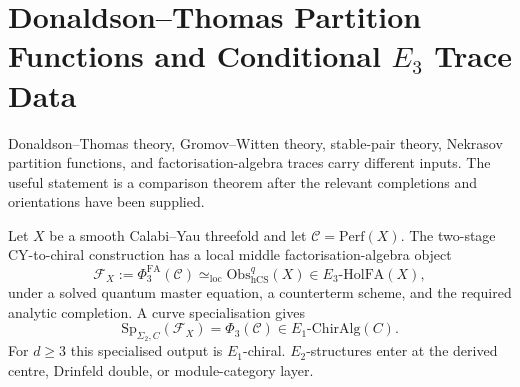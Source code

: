 \section{Donaldson--Thomas Partition Functions and Conditional
\texorpdfstring{$E_3$}{E3} Trace Data}
\label{wn:dt-e3-trace-nekrasov}

\providecommand{\PhiFA}{\Phi^{\mathrm{FA}}}
\providecommand{\Tr}{\mathrm{Tr}}
\providecommand{\Sp}{\mathrm{Sp}}
\providecommand{\QME}{\mathrm{QME}}
\providecommand{\Ethree}{E_3}
\providecommand{\Etwo}{E_2}
\providecommand{\Eone}{E_1}
\providecommand{\cC}{\mathcal{C}}
\providecommand{\cF}{\mathcal{F}}
\providecommand{\cO}{\mathcal{O}}
\providecommand{\cM}{\mathcal{M}}
\providecommand{\Obs}{\mathrm{Obs}}
\providecommand{\hCS}{\mathrm{hCS}}
\providecommand{\Hilb}{\mathrm{Hilb}}
\providecommand{\DT}{\mathrm{DT}}
\providecommand{\GW}{\mathrm{GW}}
\providecommand{\PT}{\mathrm{PT}}
\providecommand{\BPS}{\mathrm{BPS}}
\providecommand{\CoHA}{\mathrm{CoHA}}
\providecommand{\Perf}{\mathrm{Perf}}
\providecommand{\Coh}{\mathrm{Coh}}
\providecommand{\KS}{\mathrm{KS}}
\providecommand{\fgl}{\mathfrak{gl}}
\providecommand{\gghone}{\widehat{\mathfrak{gl}}_1}
\providecommand{\Wilpha}{\mathcal{W}_{1+\infty}}
\providecommand{\kch}{\kappa_{\mathrm{ch}}}
\providecommand{\kcat}{\kappa_{\mathrm{cat}}}
\providecommand{\kBKM}{\kappa_{\mathrm{BKM}}}
\providecommand{\kfiber}{\kappa_{\mathrm{fiber}}}
\providecommand{\chitop}{\chi_{\mathrm{top}}}
\providecommand{\CC}{\mathbb{C}}
\providecommand{\ZZ}{\mathbb{Z}}
\providecommand{\QQ}{\mathbb{Q}}

Donaldson--Thomas theory, Gromov--Witten theory, stable-pair theory,
Nekrasov partition functions, and factorisation-algebra traces carry
different inputs.  The useful statement is a comparison theorem after
the relevant completions and orientations have been supplied.

Let \(X\) be a smooth Calabi--Yau threefold and let
\(\cC=\Perf(X)\).  The two-stage CY-to-chiral construction has a local
middle factorisation-algebra object
\[
  \cF_X := \PhiFA_3(\cC)
  \simeq_{\mathrm{loc}} \Obs^q_{\hCS}(X)
  \in \Ethree\text{-}\mathrm{HolFA}(X),
\]
under a solved quantum master equation, a counterterm scheme, and the
required analytic completion.  A curve specialisation gives
\[
  \Sp_{\Sigma_2,C}(\cF_X)=\Phi_3(\cC)
  \in \Eone\text{-}\mathrm{ChirAlg}(C).
\]
For \(d\geq 3\) this specialised output is \(\Eone\)-chiral.
\(\Etwo\)-structures enter at the derived centre, Drinfeld double, or
module-category layer.

